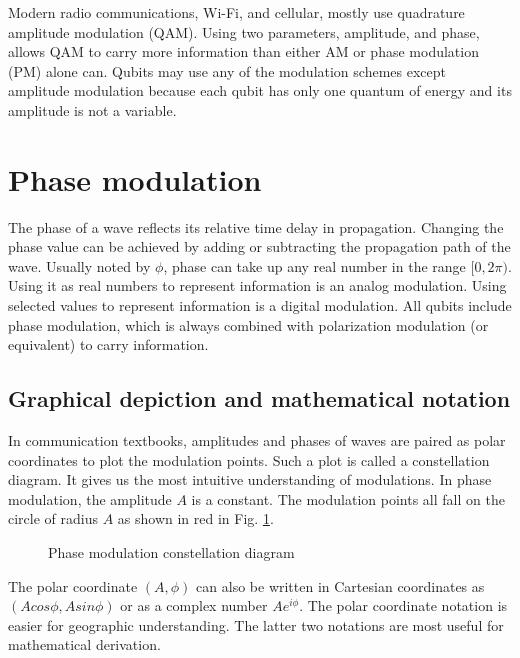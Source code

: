 \documentclass[oneside, letter, 12pt]{book}
\begin{document}
Modern radio communications, Wi-Fi, and cellular, mostly use quadrature amplitude modulation (QAM). Using two parameters, amplitude, and phase, allows QAM to carry more information than either AM or phase modulation (PM) alone can. Qubits may use any of the modulation schemes except amplitude modulation because each qubit has only one quantum of energy and its amplitude is not a variable.

\section{Phase modulation}
The phase of a wave reflects its relative time delay in propagation. Changing the phase value can be achieved by adding or subtracting the propagation path of the wave. Usually noted by $\phi$, phase can take up any real number in the range $[0, 2 \pi)$. Using it as real numbers to represent information is an analog modulation. Using selected values to represent information is a digital modulation. All qubits include phase modulation, which is always combined with polarization modulation (or equivalent) to carry information.

\subsection{Graphical depiction and mathematical notation}
In communication textbooks, amplitudes and phases of waves are paired as polar coordinates to plot the modulation points. Such a plot is called a constellation diagram. It gives us the most intuitive understanding of modulations. In phase modulation, the amplitude $A$ is a constant. The modulation points all fall on the circle of radius $A$ as shown in red in Fig. \ref{PM}.

\begin{figure}[h]\label{PM}
\caption{Phase modulation constellation diagram}
\end{figure}

The polar coordinate $(A, \phi)$ can also be written in Cartesian coordinates as $(A cos\phi, A sin\phi)$ or as a complex number $A e^{i\phi}$. The polar coordinate notation is easier for geographic understanding. The latter two notations are most useful for mathematical derivation.
\end{document}
